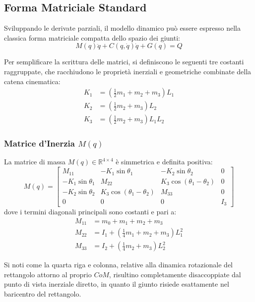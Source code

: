 \documentclass[11pt,a4paper]{article}
\begin{document}
	\subsection{Forma Matriciale Standard}
	Sviluppando le derivate parziali, il modello dinamico può essere espresso nella classica forma matriciale compatta dello spazio dei giunti:
	\begin{equation}\label{eq:matrix_form}
		M(q)\ddot{q} + C(q, \dot{q})\dot{q} + G(q) = Q
	\end{equation}
	
	Per semplificare la scrittura delle matrici, si definiscono le seguenti tre costanti raggruppate, che racchiudono le proprietà inerziali e geometriche combinate della catena cinematica:
	\begin{align}
		K_1 &= \left(\frac{1}{2}m_1 + m_2 + m_3\right)L_1 \\
		K_2 &= \left(\frac{1}{2}m_2 + m_3\right)L_2 \\
		K_3 &= \left(\frac{1}{2}m_2 + m_3\right)L_1 L_2
	\end{align}
	
	\subsubsection{Matrice d'Inerzia $M(q)$}
	La matrice di massa $M(q) \in \mathbb{R}^{4 \times 4}$ è simmetrica e definita positiva:
	\begin{equation}
		M(q) = \begin{bmatrix}
			M_{11} & -K_1\sin\theta_1 & -K_2\sin\theta_2 & 0 \\
			-K_1\sin\theta_1 & M_{22} & K_3\cos(\theta_1-\theta_2) & 0 \\
			-K_2\sin\theta_2 & K_3\cos(\theta_1-\theta_2) & M_{33} & 0 \\
			0 & 0 & 0 & I_3
		\end{bmatrix}
	\end{equation}
	dove i termini diagonali principali sono costanti e pari a:
	\begin{align}
		M_{11} &= m_0 + m_1 + m_2 + m_3 \\
		M_{22} &= I_1 + \left(\frac{1}{4}m_1 + m_2 + m_3\right)L_1^2 \\
		M_{33} &= I_2 + \left(\frac{1}{4}m_2 + m_3\right)L_2^2
	\end{align}
	
	Si noti come la quarta riga e colonna, relative alla dinamica rotazionale del rettangolo attorno al proprio $CoM$, risultino completamente disaccoppiate dal punto di vista inerziale diretto, in quanto il giunto risiede esattamente nel baricentro del rettangolo.
	
\end{document}
